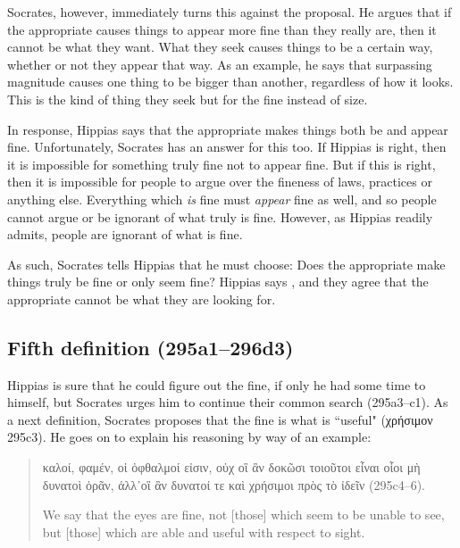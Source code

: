 \documentclass[11pt]{article}
\begin{document}
Socrates, however, immediately turns this against the proposal.  He argues
that if the appropriate causes things to appear more fine than they really
are, then it cannot be what they want.  What they seek causes things to be
a certain way, whether or not they appear that way.  As an example, he says
that surpassing magnitude causes one thing to be bigger than another,
regardless of how it looks.  This is the kind of thing they seek but for
the fine instead of size.

In response, Hippias says that the appropriate makes things both be and
appear fine.  Unfortunately, Socrates has an answer for this too.  If
Hippias is right, then it is impossible for something truly fine not to
appear fine.  But if this is right, then it is impossible for people to
argue over the fineness of laws, practices or anything else.  Everything
which \emph{is} fine must \emph{appear} fine as well, and so people cannot
argue or be ignorant of what truly is fine.  However, as Hippias readily
admits, people are ignorant of what is fine.

As such, Socrates tells Hippias that he must choose: Does the appropriate
make things truly be fine or only seem fine?  Hippias says , and they agree that the appropriate cannot be what they are looking
for.


\subsection{Fifth definition (295a1--296d3)}

Hippias is sure that he could figure out the fine, if only he had some time
to himself, but Socrates urges him to continue their common search
(295a3--c1).  As a next definition, Socrates proposes that the fine is what
is ``useful" ({\g χρήσιμον} 295c3).  He goes on to explain his reasoning by
way of an example:

\begin{quote}

    {\g
    καλοί, φαμέν, οἱ ὀφθαλμοί εἰσιν, οὐχ οἳ ἂν δοκῶσι τοιοῦτοι εἶναι οἷοι
    μὴ δυνατοὶ ὁρᾶν, ἀλλ᾽οἳ ἂν δυνατοί τε καὶ χρήσιμοι πρὸς τὸ ἰδεῖν
    } (295c4--6).

    We say that the eyes are fine, not [those] which seem to be unable to
    see, but [those] which are able and useful with respect to sight.

\end{quote}
\end{document}
